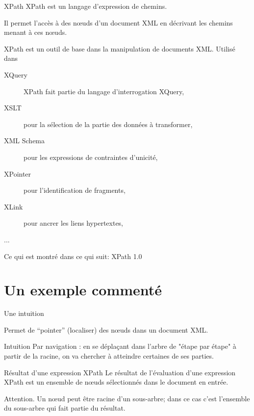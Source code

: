 
\begin{frame}{XPath}
XPath est un langage \alert{d'expression de chemins}.

\vfill

Il permet l'accès à des 
 nœuds d’un document XML en décrivant les chemins menant à ces nœuds.

\vfill

XPath est un outil de base dans la manipulation de documents XML. Utilisé dans 
\begin{description}
\item[XQuery] XPath fait partie du langage d’interrogation XQuery,
\item[XSLT] pour la sélection de la partie des données à transformer,
\item[XML Schema] pour les expressions de contraintes d’unicité,
\item[XPointer] pour l'identification de fragments,
\item[XLink] pour ancrer les liens hypertextes,
\item[...]
\end{description}

Ce qui est montré dans ce qui suit: XPath 1.0

\end{frame}


\section{Un exemple commenté}

\begin{frame}{Une intuition}

Permet de ``pointer'' (localiser) des nœuds dans un document XML.

\begin{exampleblock}{Intuition}
Par \alert{navigation} : en se déplaçant dans l'arbre de "étape par étape" à partir de la racine, on va chercher à 
   atteindre certaines de ses parties.
\end{exampleblock}

\vfill

\begin{block}{Résultat d'une expression XPath}
Le résultat de l'évaluation d'une expression XPath est un \alert{ensemble de nœuds} sélectionnés dans le
document en entrée.
\end{block}

\vfill

\alert{Attention}.  Un nœud peut être racine d'un sous-arbre; dans ce cas
c'est l'ensemble du sous-arbre qui fait partie du résultat.
 
\end{frame}

